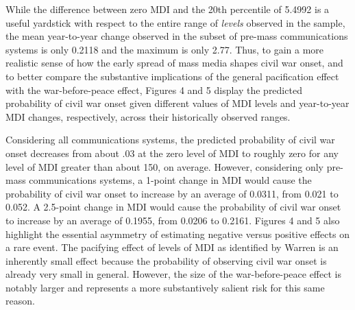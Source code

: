 \documentclass[12pt,article,oneside]{memoir}
\begin{document}
\begin{table}[!htbp]
\end{table}
\clearpage

While the difference between zero MDI and the 20th percentile of 5.4992
is a useful yardstick with respect to the entire range of \emph{levels}
observed in the sample, the mean year-to-year change observed in the
subset of pre-mass communications systems is only 0.2118 and the maximum
is only 2.77. Thus, to gain a more realistic sense of how the early
spread of mass media shapes civil war onset, and to better compare the
substantive implications of the general pacification effect with the
war-before-peace effect, Figures 4 and 5 display the predicted
probability of civil war onset given different values of MDI levels and
year-to-year MDI changes, respectively, across their historically
observed ranges.

Considering all communications systems, the predicted probability of
civil war onset decreases from about .03 at the zero level of MDI to
roughly zero for any level of MDI greater than about 150, on average.
However, considering only pre-mass communications systems, a 1-point
change in MDI would cause the probability of civil war onset to increase
by an average of 0.0311, from 0.021 to 0.052. A 2.5-point change in MDI
would cause the probability of civil war onset to increase by an average
of 0.1955, from 0.0206 to 0.2161. Figures 4 and 5 also highlight the
essential asymmetry of estimating negative versus positive effects on a
rare event. The pacifying effect of levels of MDI as identified by
Warren is an inherently small effect because the probability of
observing civil war onset is already very small in general. However, the
size of the war-before-peace effect is notably larger and represents a
more substantively salient risk for this same reason.
\end{document}
